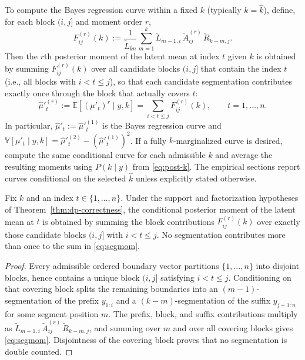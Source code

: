 To compute the Bayes regression curve within a fixed $k$ (typically $k=\widehat{k}$),
define, for each block $(i,j]$ and moment order $r$,
\[
F^{(r)}_{ij}(k)
 := \frac{1}{\widetilde{L}_{k n}}\sum_{m=1}^k
       \widetilde{L}_{m-1,i}\,\widetilde{A}^{(r)}_{ij}\,\widetilde{R}_{k-m,j}.
\]
Then the $r$th posterior moment of the latent mean at index $t$ given $k$ is obtained by summing
$F^{(r)}_{ij}(k)$ over all candidate blocks $(i,j]$ that contain the index $t$ (i.e., all blocks
with $i<t\le j$), so that each candidate segmentation contributes exactly once through the block
that actually covers $t$:
\begin{equation}
\widehat{\mu}'^{(r)}_t
 := \mathbb{E}[(\mu'_t)^r\mid y,k]
 = \sum_{i<t\le j} F^{(r)}_{ij}(k),
\qquad t=1,\dots,n.
\label{eq:segmom}
\end{equation}
In particular, $\widehat{\mu}'_t := \widehat{\mu}'^{(1)}_t$ is the Bayes regression curve and
$\mathbb{V}[\mu'_t\mid y,k]
 = \widehat{\mu}'^{(2)}_t - (\widehat{\mu}'^{(1)}_t)^2$.
If a fully $k$-marginalized curve is desired, compute the same conditional curve for each admissible
$k$ and average the resulting moments using $P(k\mid y)$ from \eqref{eq:post-k}. The empirical
sections report curves conditional on the selected $\widehat k$ unless explicitly stated otherwise.

\begin{proposition}
\label{prop:block-covering-decomposition}
Fix $k$ and an index $t\in\{1,\dots,n\}$. Under the support and factorization hypotheses of
Theorem~\ref{thm:dp-correctness}, the conditional posterior moment of the latent mean at $t$ is
obtained by summing the block contributions $F^{(r)}_{ij}(k)$ over exactly those candidate blocks
$(i,j]$ with $i<t\le j$. No segmentation contributes more than once to the sum in
\eqref{eq:segmom}.
\end{proposition}

\begin{proof}
Every admissible ordered boundary vector partitions $\{1,\dots,n\}$ into disjoint blocks, hence
contains a unique block $(i,j]$ satisfying $i<t\le j$. Conditioning on that covering block splits
the remaining boundaries into an $(m-1)$-segmentation of the prefix $y_{1:i}$ and a
$(k-m)$-segmentation of the suffix $y_{j+1:n}$ for some segment position $m$. The prefix, block, and
suffix contributions multiply as
$\widetilde L_{m-1,i}\,\widetilde A^{(r)}_{ij}\,\widetilde R_{k-m,j}$, and summing over $m$ and
over all covering blocks gives \eqref{eq:segmom}. Disjointness of the covering block proves that no
segmentation is double counted.
\end{proof}

